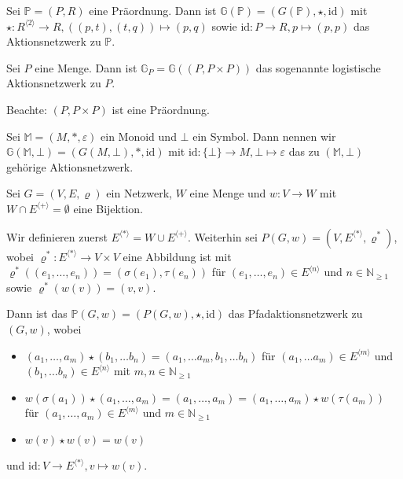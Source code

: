 \documentclass{article}
\begin{document}
\begin{example}
  Sei $\mathbb{P} = (P, R)$ eine Präordnung.
  Dann ist $\mathbb{G}(\mathbb{P}) = (G(\mathbb{P}), \star, \text{id})$
  mit  $\star \colon R^{\langle 2 \rangle} \to R, ((p, t), (t, q)) \mapsto (p, q)$
  sowie $\text{id} \colon P \to R, p \mapsto (p, p)$
  das Aktionsnetzwerk zu $\mathbb{P}$.
\end{example}

\begin{example}
  Sei $P$ eine Menge. Dann ist $\mathbb{G}_P = \mathbb{G}((P, P \times P))$
  das sogenannte logistische Aktionsnetzwerk zu $P$.

  Beachte: $(P, P \times P)$ ist eine Präordnung.
\end{example}

\begin{example}
  Sei $\mathbb{M} = (M, \ast, \varepsilon)$ ein Monoid und $\bot$ ein Symbol.
  Dann nennen wir $\mathbb{G}(\mathbb{M}, \bot) = (G(M, \bot), \ast, \text{id})$
  mit $\text{id} \colon \{\bot\} \to M, \bot \mapsto \varepsilon$
  das zu $(\mathbb{M}, \bot)$ gehörige Aktionsnetzwerk.
\end{example}

\begin{example}
  Sei $G = (V, E, \varrho)$ ein Netzwerk, $W$ eine Menge und $w \colon V \to W$
  mit $W \cap E^{\langle + \rangle} = \emptyset$ eine Bijektion.

  Wir definieren zuerst $E^{\langle \ast \rangle} = W \cup E^{\langle + \rangle}$.
  Weiterhin sei $P(G, w) = (V, E^{\langle \ast \rangle}, \varrho^\ast)$,
  wobei $\varrho^\ast \colon E^{\langle \ast \rangle} \to V \times V$
  eine Abbildung ist mit $\varrho^\ast((e_1, \dots, e_n)) = (\sigma(e_1), \tau(e_n))$
  für $(e_1, \dots, e_n) \in E^{\langle n \rangle}$ und $n \in \mathbb{N}_{\geq 1}$
  sowie $\varrho^\ast(w(v)) = (v, v)$.

  Dann ist das $\mathbb{P}(G, w) = (P(G, w), \star, \text{id})$ 
  das Pfadaktionsnetzwerk zu $(G, w)$,
  wobei
  \begin{itemize}
    \item $(a_1, \dots, a_m) \star (b_1, \dots b_n) = (a_1, \dots a_m, b_1, \dots b_n)$
          für $(a_1, \dots a_m) \in E^{\langle m \rangle}$
          und $(b_1, \dots b_n) \in E^{\langle n \rangle}$
          mit $m, n \in \mathbb{N}_{\geq 1}$
    \item $w(\sigma(a_1)) \star (a_1, \dots, a_m) = (a_1, \dots, a_m) = (a_1, \dots, a_m) \star w(\tau(a_m))$
          für $(a_1, \dots, a_m) \in E^{\langle m \rangle}$ und $m \in \mathbb{N}_{\geq 1}$
    \item $w(v) \star w(v) = w(v)$
  \end{itemize}
  und $\text{id} \colon V \to E^{\langle \ast \rangle}, v \mapsto w(v)$.
\end{example}
\end{document}
